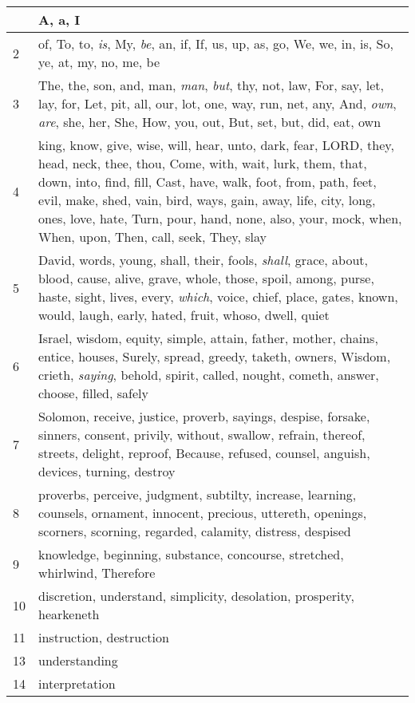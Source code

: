 \begin{center}
\begin{longtable}{l|p{3.75in}}
\hline \hline 
\endlastfoot 
1 & A, a, I\\ \hline 
2 & of, To, to, \emph{is}, My, \emph{be}, an, if, If, us, up, as, go, We, we, in, is, So, ye, at, my, no, me, be\\ \hline 
3 & The, the, son, and, man, \emph{man}, \emph{but}, thy, not, law, For, say, let, lay, for, Let, pit, all, our, lot, one, way, run, net, any, And, \emph{own}, \emph{are}, she, her, She, How, you, out, But, set, but, did, eat, own\\ \hline 
4 & king, know, give, wise, will, hear, unto, dark, fear, LORD, they, head, neck, thee, thou, Come, with, wait, lurk, them, that, down, into, find, fill, Cast, have, walk, foot, from, path, feet, evil, make, shed, vain, bird, ways, gain, away, life, city, long, ones, love, hate, Turn, pour, hand, none, also, your, mock, when, When, upon, Then, call, seek, They, slay\\ \hline 
5 & David, words, young, shall, their, fools, \emph{shall}, grace, about, blood, cause, alive, grave, whole, those, spoil, among, purse, haste, sight, lives, every, \emph{which}, voice, chief, place, gates, known, would, laugh, early, hated, fruit, whoso, dwell, quiet\\ \hline 
6 & Israel, wisdom, equity, simple, attain, father, mother, chains, entice, houses, Surely, spread, greedy, taketh, owners, Wisdom, crieth, \emph{saying}, behold, spirit, called, nought, cometh, answer, choose, filled, safely\\ \hline 
7 & Solomon, receive, justice, proverb, sayings, despise, forsake, sinners, consent, privily, without, swallow, refrain, thereof, streets, delight, reproof, Because, refused, counsel, anguish, devices, turning, destroy\\ \hline 
8 & proverbs, perceive, judgment, subtilty, increase, learning, counsels, ornament, innocent, precious, uttereth, openings, scorners, scorning, regarded, calamity, distress, despised\\ \hline 
9 & knowledge, beginning, substance, concourse, stretched, whirlwind, Therefore\\ \hline 
10 & discretion, understand, simplicity, desolation, prosperity, hearkeneth\\ \hline 
11 & instruction, destruction\\ \hline 
13 & understanding\\ \hline 
14 & interpretation\\ \hline 
\end{longtable} 
\end{center} 




 
